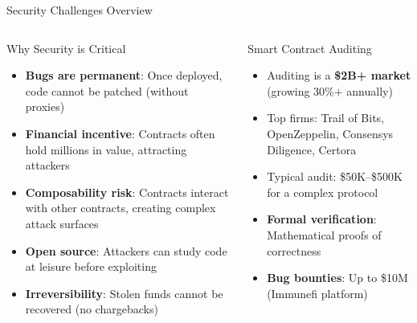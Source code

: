 \documentclass[8pt,aspectratio=169]{beamer}
\begin{document}
\begin{frame}{Security Challenges Overview}
\begin{columns}[T]
\begin{block}{Why Security is Critical}
\footnotesize
\begin{itemize}
  \item \textbf{Bugs are permanent}: Once deployed, code cannot be patched (without proxies)
  \item \textbf{Financial incentive}: Contracts often hold millions in value, attracting attackers
  \item \textbf{Composability risk}: Contracts interact with other contracts, creating complex attack surfaces
  \item \textbf{Open source}: Attackers can study code at leisure before exploiting
  \item \textbf{Irreversibility}: Stolen funds cannot be recovered (no chargebacks)
\end{itemize}
\end{block}
\vspace{2mm}
\begin{block}{Smart Contract Auditing}
\footnotesize
\begin{itemize}
  \item Auditing is a \textbf{\$2B+ market} (growing 30\%+ annually)
  \item Top firms: Trail of Bits, OpenZeppelin, Consensys Diligence, Certora
  \item Typical audit: \$50K--\$500K for a complex protocol
  \item \textbf{Formal verification}: Mathematical proofs of correctness
  \item \textbf{Bug bounties}: Up to \$10M (Immunefi platform)
\end{itemize}
\end{block}


\end{columns}
\end{frame}
\end{document}
